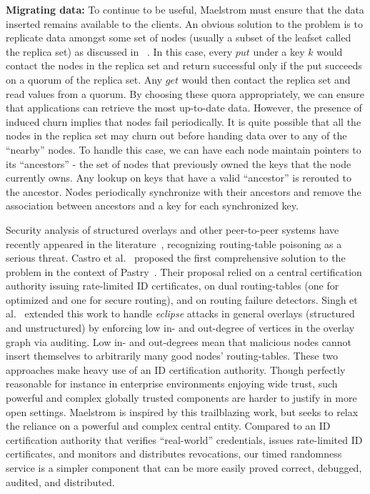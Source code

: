 \documentclass[10pt,twocolumn]{article}
\renewcommand{\paragraph}[1]{\textbf{#1:}}
\begin{document}
\paragraph{Migrating data}
To continue to be useful, Maelstrom must ensure that the data inserted remains available to the clients. An obvious solution to the problem is to replicate data amongst some set of nodes (usually a subset of the leafset called the replica set) as discussed in~\cite{Slowness-OpenDHT} . In this case, every $put$ under a key $k$ would contact the nodes in the replica set and return successful only if the put succeeds on a quorum of the replica set. Any $get$ would then contact the replica set and read values from a quorum. By choosing these quora appropriately, we can ensure that applications can retrieve the most up-to-date data. However, the presence of induced churn implies that nodes fail periodically. It is quite possible that all the nodes in the replica set may churn out before handing data over to any of the ``nearby'' nodes. To handle this case, we can have each node maintain pointers to its ``ancestors'' - the set of nodes that previously owned the keys that the node currently owns. Any lookup on keys that have a valid ``ancestor'' is rerouted to the ancestor. Nodes periodically synchronize with their ancestors and remove the association between ancestors and a key for each synchronized key.



Security analysis of structured overlays and 
other peer-to-peer systems have recently appeared in the
literature~\cite{Douceur2002,Sit2002,Wallach2002}, recognizing 
routing-table poisoning as a serious threat.
Castro et al.~\cite{Castro2002} proposed the first comprehensive
solution to the problem in the context of
Pastry~\cite{Rowstron2001}. Their proposal relied on a central certification authority
issuing rate-limited ID certificates, on dual
routing-tables (one for optimized and one for secure routing),
and on routing failure detectors.  Singh et al.~\cite{Singh2004} extended this work to handle
\emph{eclipse} attacks in general overlays (structured and unstructured)
by enforcing low in- and out-degree of vertices in the overlay graph via
auditing.  Low in- and out-degrees mean that malicious nodes cannot
insert themselves to arbitrarily many good nodes' routing-tables.
These two approaches make heavy use of an ID certification authority.
Though perfectly
reasonable for instance in enterprise environments enjoying wide
trust, such powerful and complex globally
trusted components are harder to justify in more open settings.
Maelstrom is inspired by this trailblazing work, but seeks to relax the reliance
on a powerful and complex central entity. Compared to an ID certification
authority that verifies ``real-world'' credentials, issues
rate-limited ID certificates, and monitors and distributes revocations, our
timed randomness service is a simpler component that can be more easily
proved correct, debugged, audited, and distributed.
\end{document}
